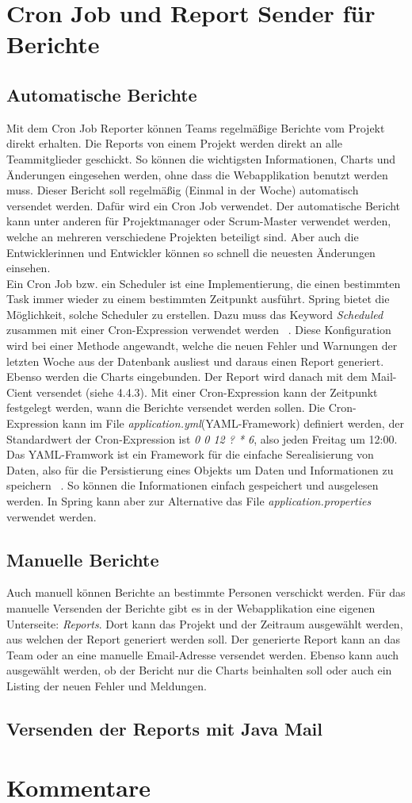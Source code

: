 \section{Cron Job und Report Sender für Berichte}
\subsection{Automatische Berichte} 
Mit dem Cron Job Reporter können Teams regelmäßige Berichte vom Projekt direkt erhalten. Die Reports von einem Projekt werden direkt an alle Teammitglieder geschickt. So können die wichtigsten Informationen, Charts und Änderungen eingesehen werden, ohne dass die Webapplikation benutzt werden muss. Dieser Bericht soll regelmäßig (Einmal in der Woche) automatisch versendet werden. Dafür wird ein Cron Job verwendet. Der automatische Bericht kann unter anderen für Projektmanager oder Scrum-Master verwendet werden, welche an mehreren verschiedene Projekten beteiligt sind. Aber auch die Entwicklerinnen und Entwickler können so schnell die neuesten Änderungen einsehen. \\ Ein Cron Job bzw. ein Scheduler ist eine Implementierung, die einen bestimmten Task immer wieder zu einem bestimmten Zeitpunkt ausführt. Spring bietet die Möglichkeit, solche Scheduler zu erstellen. Dazu muss das Keyword \textit{Scheduled} zusammen mit einer Cron-Expression verwendet werden ~\parencite{cintirScheduler}. Diese Konfiguration wird bei einer Methode angewandt, welche die neuen Fehler und Warnungen der letzten Woche aus der Datenbank ausliest und daraus einen Report generiert. Ebenso werden die Charts eingebunden. Der Report wird danach mit dem Mail-Cient versendet (siehe 4.4.3). Mit einer Cron-Expression kann der Zeitpunkt festgelegt werden, wann die Berichte versendet werden sollen. Die Cron-Expression kann im File \textit{application.yml}(YAML-Framework) definiert werden, der Standardwert der Cron-Expression ist \textit{0 0 12 ? * 6}, also jeden Freitag um 12:00. Das YAML-Framwork ist ein Framework für die einfache Serealisierung von Daten, also für die Persistierung eines Objekts um Daten und Informationen zu speichern ~\parencite{eriksson2011comparison}. So können die Informationen einfach gespeichert und ausgelesen werden. In Spring kann aber zur Alternative das File \textit{application.properties} verwendet werden. 
\subsection{Manuelle Berichte}
Auch manuell können Berichte an bestimmte Personen verschickt werden. Für das manuelle Versenden der Berichte gibt es in der Webapplikation eine eigenen Unterseite: \textit{Reports}. Dort kann das Projekt und der Zeitraum ausgewählt werden, aus welchen der Report generiert werden soll. Der generierte Report kann an das Team oder an eine manuelle Email-Adresse versendet werden. Ebenso kann auch ausgewählt werden, ob der Bericht nur die Charts beinhalten soll oder auch ein Listing der neuen Fehler und Meldungen.
\subsection{Versenden der Reports mit Java Mail}
\section{Kommentare}
\chapterend